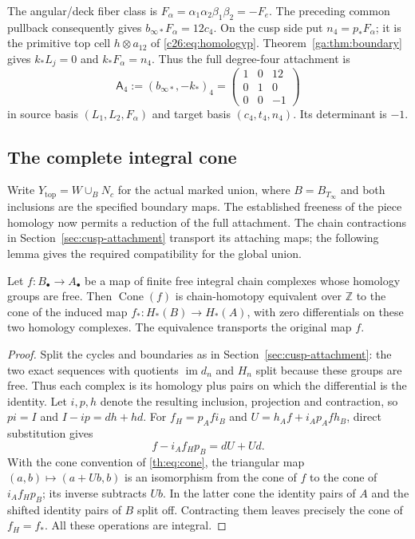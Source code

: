 The angular/deck fiber class is
$F_\alpha=\alpha_1\alpha_2\beta_1\beta_2=-F_e$.
The preceding common pullback consequently gives
$b_{\infty*}F_\alpha=12c_4$.
On the cusp side put $n_4=p_*F_\alpha$; it is the primitive top cell
$h\otimes a_{12}$ of \eqref{c26:eq:homologyp}.
Theorem~\ref{ga:thm:boundary} gives $k_*L_j=0$ and $k_*F_\alpha=n_4$.
Thus the full degree-four attachment is
\begin{equation}\label{th:eq:A4}
 \mathsf A_4:=(b_{\infty*},-k_*)_4
 =\begin{pmatrix}1&0&12\\0&1&0\\0&0&-1\end{pmatrix}
\end{equation}
in source basis $(L_1,L_2,F_\alpha)$ and target basis $(c_4,t_4,n_4)$.
Its determinant is $-1$.

\subsection{The complete integral cone}

Write $Y_{\mathrm{top}}=W\cup_BN_c$ for the actual marked union, where
$B=B_{T_\infty}$ and both inclusions are the specified boundary maps.
The established freeness of the piece homology now permits a reduction
of the full attachment. The chain contractions in
Section~\ref{sec:cusp-attachment} transport its attaching maps; the
following lemma gives the required compatibility for the global union.

\begin{lemma}\label{th:lem:integral-splitting}
Let $f:B_\bullet\to A_\bullet$ be a map of finite free integral chain
complexes whose homology groups are free. Then $\operatorname{Cone}(f)$
is chain-homotopy equivalent over $\mathbb Z$ to the cone of the induced
map $f_*:H_*(B)\to H_*(A)$, with zero differentials on these two
homology complexes. The equivalence transports the original map $f$.
\end{lemma}

\begin{proof}
Split the cycles and boundaries as in
Section~\ref{sec:cusp-attachment}: the two exact sequences with quotients
$\operatorname{im}d_{n}$ and $H_n$ split because these groups are free.
Thus each complex is its homology plus pairs on which the differential
is the identity. Let $i,p,h$ denote the resulting inclusion, projection
and contraction, so $pi=I$ and $I-ip=dh+hd$.
For $f_H=p_Afi_B$ and $U=h_Af+i_Ap_Afh_B$, direct substitution gives
\[
 f-i_Af_Hp_B=dU+Ud.
\]
With the cone convention of \eqref{th:eq:cone}, the triangular map
$(a,b)\mapsto(a+Ub,b)$ is an isomorphism from the cone of $f$ to the
cone of $i_Af_Hp_B$; its inverse subtracts $Ub$.
In the latter cone the identity pairs of $A$ and the shifted identity
pairs of $B$ split off. Contracting them leaves precisely the cone of
$f_H=f_*$. All these operations are integral.
\end{proof}


